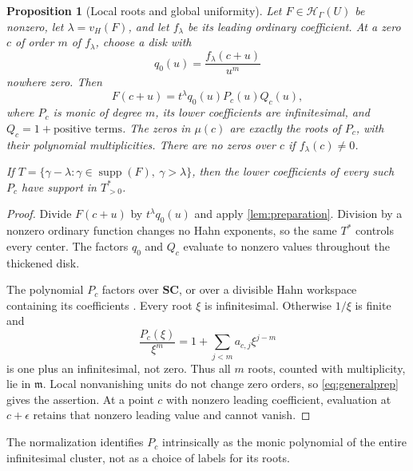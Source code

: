 \documentclass[11pt,letterpaper]{article}
\newtheorem{proposition}[theorem]{Proposition}
\theoremstyle{definition}
\theoremstyle{remark}
\newcommand{\SC}{\mathbf{SC}}
\newcommand{\HH}{\mathscr H_\Gamma}
\newcommand{\mm}{\mathfrak m}
\newcommand{\supp}{\operatorname{supp}}
\numberwithin{equation}{section}
\begin{document}
\begin{proposition}[Local roots and global uniformity]\label{prop:rootcount}
Let $F\in\HH(U)$ be nonzero, let $\lambda=v_H(F)$, and let $f_\lambda$ be its leading ordinary coefficient. At a zero $c$ of order $m$ of $f_\lambda$, choose a disk with
\[
 q_0(u)=\frac{f_\lambda(c+u)}{u^m}
\]
nowhere zero. Then
\begin{equation}\label{eq:generalprep}
 F(c+u)=t^\lambda q_0(u)P_c(u)Q_c(u),
\end{equation}
where $P_c$ is monic of degree $m$, its lower coefficients are infinitesimal, and $Q_c=1+\text{positive terms}$. The zeros in $\mu(c)$ are exactly the roots of $P_c$, with their polynomial multiplicities. There are no zeros over $c$ if $f_\lambda(c)\ne0$.

If $T=\{\gamma-\lambda:\gamma\in\supp(F),\ \gamma>\lambda\}$, then the lower coefficients of \emph{every} such $P_c$ have support in $T^*_{>0}$.
\end{proposition}
\begin{proof}
Divide $F(c+u)$ by $t^\lambda q_0(u)$ and apply \cref{lem:preparation}. Division by a nonzero ordinary function changes no Hahn exponents, so the same $T^*$ controls every center. The factors $q_0$ and $Q_c$ evaluate to nonzero values throughout the thickened disk.

The polynomial $P_c$ factors over $\SC$, or over a divisible Hahn workspace containing its coefficients \cite[Corollary~4]{Poonen}. Every root $\xi$ is infinitesimal. Otherwise $1/\xi$ is finite and
\[
 \frac{P_c(\xi)}{\xi^m}
 =1+\sum_{j<m}a_{c,j}\xi^{j-m}
\]
is one plus an infinitesimal, not zero. Thus all $m$ roots, counted with multiplicity, lie in $\mm$. Local nonvanishing units do not change zero orders, so \eqref{eq:generalprep} gives the assertion. At a point $c$ with nonzero leading coefficient, evaluation at $c+\epsilon$ retains that nonzero leading value and cannot vanish.
\end{proof}
The normalization identifies $P_c$ intrinsically as the monic polynomial of the entire infinitesimal cluster, not as a choice of labels for its roots.
\end{document}

